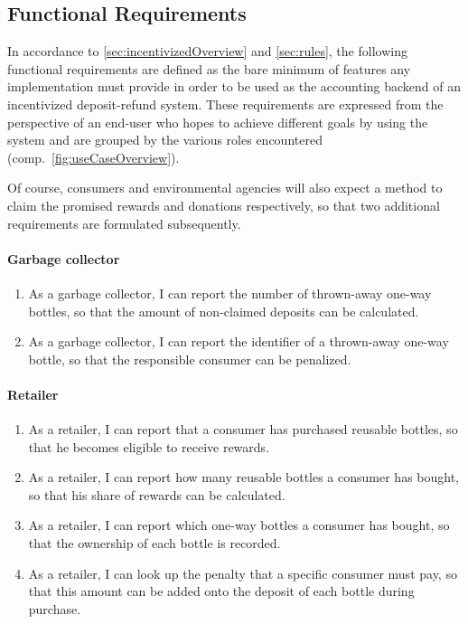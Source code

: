 \def\twodigits#1{%
  \ifnum#1<10 0\fi
  \number#1}

\subsection{Functional Requirements}
\label{sec:FRs}
In accordance to \autoref{sec:incentivizedOverview} and \autoref{sec:rules}, the following functional requirements are defined as the bare minimum of features any implementation must provide in order to be used as the accounting backend of an incentivized deposit-refund system. These requirements are expressed from the perspective of an end-user who hopes to achieve different goals by using the system and are grouped by the various roles encountered (comp.~\autoref{fig:useCaseOverview}).

Of course, consumers and environmental agencies will also expect a method to claim the promised rewards and donations respectively, so that two additional requirements are formulated subsequently.

\paragraph{Garbage collector}
\begin{enumerate}[font=\sffamily,label={\textbf{FR-\protect\twodigits{\theenumi}}},leftmargin=1.4cm, ref=FR-\protect\twodigits{\theenumi}]
	\item As a garbage collector, I can report the number of thrown-away one-way bottles, so that the amount of non-claimed deposits can be calculated. \label{itm:reportNumber}
	\item As a garbage collector, I can report the identifier of a thrown-away one-way bottle, so that the responsible consumer can be penalized. \label{itm:reportIdentifier}
\end{enumerate}

\paragraph{Retailer}
\begin{enumerate}[resume, font=\sffamily, label={\textbf{FR-\protect\twodigits{\theenumi}}},leftmargin=1.4cm, ref=FR-\protect\twodigits{\theenumi}]
	\item As a retailer, I can report that a consumer has purchased reusable bottles, so that he becomes eligible to receive rewards. \label{itm:reportReusablePurchase}
	\item As a retailer, I can report how many reusable bottles a consumer has bought, so that his share of rewards can be calculated. \label{itm:reportReusableNumber}
	\item As a retailer, I can report which one-way bottles a consumer has bought, so that the ownership of each bottle is recorded. \label{itm:reportOneWays}
	\item As a retailer, I can look up the penalty that a specific consumer must pay, so that this amount can be added onto the deposit of each bottle during purchase. \label{itm:lookUpPenalty}
\end{enumerate}

